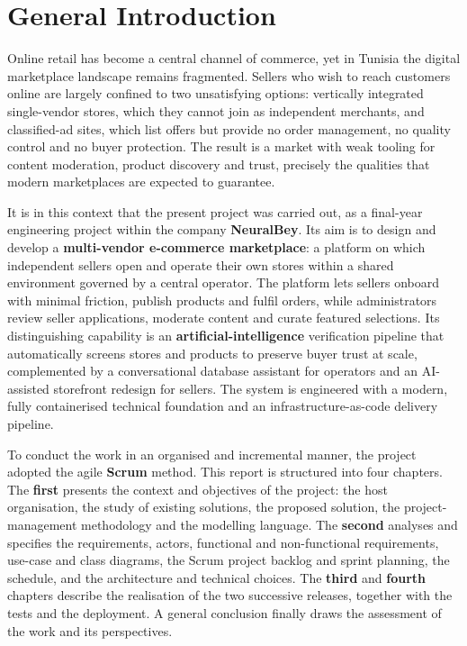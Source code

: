 \chapter*{General Introduction}

Online retail has become a central channel of commerce, yet in Tunisia
the digital marketplace landscape remains fragmented. Sellers who wish
to reach customers online are largely confined to two unsatisfying
options: vertically integrated single-vendor stores, which they cannot
join as independent merchants, and classified-ad sites, which list
offers but provide no order management, no quality control and no
buyer protection. The result is a market with weak tooling for content
moderation, product discovery and trust, precisely the qualities
that modern marketplaces are expected to guarantee.

It is in this context that the present project was carried out, as a
final-year engineering project within the company \textbf{NeuralBey}.
Its aim is to design and develop a \textbf{multi-vendor e-commerce
marketplace}: a platform on which independent sellers open and operate
their own stores within a shared environment governed by a central
operator. The platform lets sellers onboard with minimal friction,
publish products and fulfil orders, while administrators review seller
applications, moderate content and curate featured selections. Its
distinguishing capability is an \textbf{artificial-intelligence}
verification pipeline that automatically screens stores and products to
preserve buyer trust at scale, complemented by a conversational
database assistant for operators and an AI-assisted storefront redesign
for sellers. The system is engineered with a modern, fully
containerised technical foundation and an infrastructure-as-code
delivery pipeline.

To conduct the work in an organised and incremental manner, the project
adopted the agile \textbf{Scrum} method. This report is structured into
four chapters. The \textbf{first} presents the context and objectives
of the project: the host organisation, the study of existing solutions,
the proposed solution, the project-management methodology and the
modelling language. The \textbf{second} analyses and specifies the
requirements, actors, functional and non-functional requirements,
use-case and class diagrams, the Scrum project backlog and sprint
planning, the schedule, and the architecture and technical choices. The
\textbf{third} and \textbf{fourth} chapters describe the realisation of
the two successive releases, together with the tests and the
deployment. A general conclusion finally draws the assessment of the
work and its perspectives.
